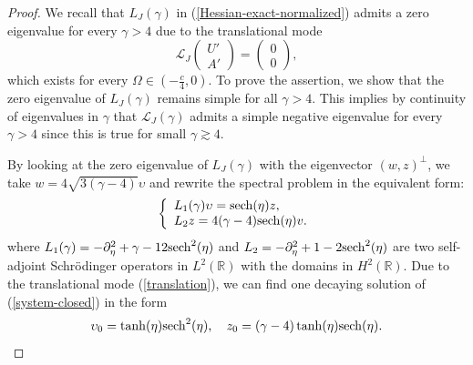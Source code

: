 \documentclass[12pt,reqno]{amsart}
\numberwithin{equation}{section}
\begin{document}
\begin{proof}
We recall that $L_J(\gamma)$ in (\ref{Hessian-exact-normalized}) admits a zero eigenvalue for every $\gamma > 4$ due to the translational mode 
\begin{equation}
    \label{translation}
\mathcal{L}_J \begin{pmatrix} U' \\ A' \end{pmatrix} = \begin{pmatrix} 0 \\ 0 \end{pmatrix},
\end{equation}
which exists for every $\Omega \in \left( -\frac{c}{4},0\right)$. To prove the assertion, we show that the zero eigenvalue of $L_J(\gamma)$ remains simple for all $\gamma > 4$. This implies by continuity of eigenvalues in $\gamma$ that 
$\mathcal{L}_J(\gamma)$ admits a simple negative eigenvalue for every $\gamma > 4$ since this is true for small $\gamma \gtrsim 4$. 

By looking at the zero eigenvalue of $L_J(\gamma)$ with the eigenvector $(w,z)^{\perp}$, we take  $w = 4 \sqrt{3(\gamma - 4)} \upsilon$ and rewrite the spectral problem in the equivalent form:
\begin{equation}
\label{system-closed}
    \left\{ \begin{array}{l} L_1(\gamma) \upsilon = {\rm sech}(\eta) z, \\
    L_2 z = 4(\gamma - 4) {\rm sech}(\eta) v. \end{array} \right.
\end{equation}
where $L_1(\gamma) = -\partial_{\eta}^2 + \gamma - 12 {\rm sech}^2(\eta)$ and $L_2 = -\partial_{\eta}^2 + 1 - 2 {\rm sech}^2(\eta)$ 
are two self-adjoint Schr\"{o}dinger operators in $L^2(\mathbb{R})$ with the domains in $H^2(\mathbb{R})$. Due to the translational mode 
(\ref{translation}), we can find one decaying solution of (\ref{system-closed}) in the form
\begin{equation}
    \label{translation-0}
\upsilon_0 = \tanh(\eta) {\rm sech}^2(\eta), \quad z_0 =  (\gamma - 4) \tanh(\eta) {\rm sech}(\eta).
\end{equation}


\end{proof}
\end{document}
